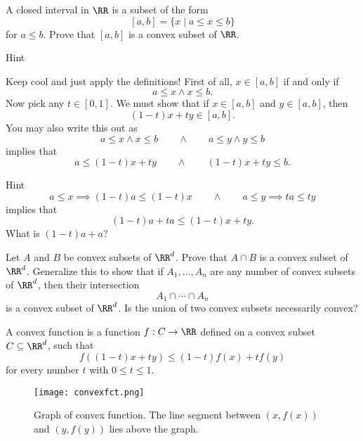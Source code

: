 \documentclass{article}
\begin{document}
    \beginshex
      A closed interval in $\RR$ is a subset of the form
      $$
      [a, b] = \{x \mid a \leq x \leq b\}
      $$
      for $a \leq b$. Prove that $[a, b]$ is a convex subset of $\RR$.

\begin{hideinbutton}{Hint}

Keep cool and just apply the definitions! First of all, $x\in [a, b]$ if and only if
\begin{equation}\label{intdef}
a\leq x \land x \leq b.
\end{equation}
Now pick any $t\in [0, 1]$. We must show that if $x\in [a, b]$ and $y\in [a, b]$, then
$$
(1 - t)x + t y \in [a, b].
$$
You may also write this out as
$$
a\leq x \land x \leq b\qquad\land\qquad a\leq y \land y \leq b
$$
implies that
$$
a\leq (1 - t)x + t y \qquad \land \qquad (1 - t)x + t y \leq b. 
$$

\begin{hideinbutton}{Hint}
$$
a\leq x\implies (1-t) a \leq (1-t) x\qquad\land\qquad a\leq y \implies t a \leq t y
$$
implies that 
$$
(1 - t) a + t a \leq (1-t)x + t y.
$$
What is $(1-t)a + a$?
\end{hideinbutton}

\end{hideinbutton}
      
\endshex

   
    \beginshex
    Let $A$ and $B$ be convex subsets of $\RR^d$. Prove that $A\cap B$ is a
    convex subset of $\RR^d$. Generalize this to show that if $A_1, \dots, A_n$
    are any number of convex subsets of $\RR^d$, then their intersection
    $$
    A_1 \cap \cdots \cap A_n
    $$
    is a convex subset of $\RR^d$. Is the union of two convex subsets necessarily convex?
    \endshex
    
    \begin{definition}[emph]\label{Def:convexfunction}
    A convex function is a function $f: C\rightarrow \RR$
    defined on a convex subset $C\subseteq \RR^d$, such that
    $$
    f((1 - t) x + t y) \leq (1-t) f(x) + t f(y)
    $$
    for every number $t$ with $0\leq t \leq 1$.
    \end{definition}

\begin{figure}
  \texttt{[image: convexfct.png]}
  \begin{center}
    Graph of convex function. The line segment between $(x, f(x))$ and $(y, f(y))$
    lies above the graph.
  \end{center}
\end{figure}
\end{document}
